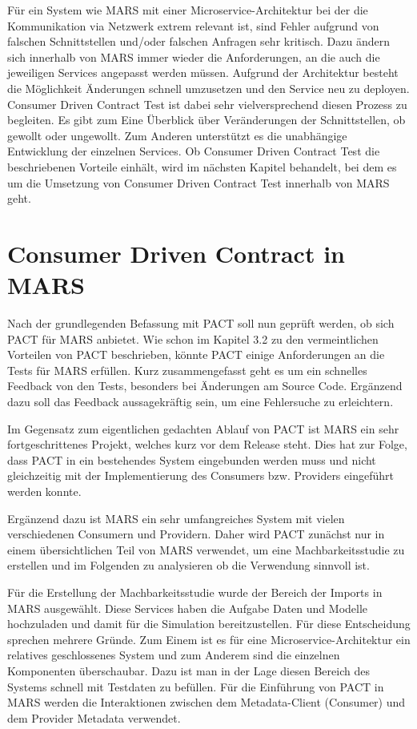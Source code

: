 \documentclass{llncs}
\begin{document}
Für ein System wie MARS mit einer Microservice-Architektur bei der die Kommunikation via Netzwerk extrem relevant ist, sind Fehler aufgrund von falschen Schnittstellen und/oder falschen Anfragen sehr kritisch. Dazu ändern sich innerhalb von MARS immer wieder die Anforderungen, an die auch die jeweiligen Services angepasst werden müssen. Aufgrund der Architektur besteht die Möglichkeit Änderungen schnell umzusetzen und den Service neu zu deployen. Consumer Driven Contract Test ist dabei sehr vielversprechend diesen Prozess zu begleiten. Es gibt zum Eine Überblick über Veränderungen der Schnittstellen, ob gewollt oder ungewollt. Zum Anderen unterstützt es die unabhängige Entwicklung der einzelnen Services. Ob Consumer Driven Contract Test die beschriebenen Vorteile einhält, wird im nächsten Kapitel behandelt, bei dem es um die Umsetzung von Consumer Driven Contract Test innerhalb von MARS geht.

\section{Consumer Driven Contract in MARS}
Nach der grundlegenden Befassung mit PACT soll nun geprüft werden, ob sich PACT für MARS anbietet. Wie schon im Kapitel 3.2 zu den vermeintlichen Vorteilen von PACT beschrieben, könnte PACT einige Anforderungen an die Tests für MARS erfüllen.
Kurz zusammengefasst geht es um ein schnelles Feedback von den Tests, besonders bei Änderungen am Source Code. Ergänzend dazu soll das Feedback aussagekräftig sein, um eine Fehlersuche zu erleichtern.

Im Gegensatz zum eigentlichen gedachten Ablauf von PACT ist MARS ein sehr fortgeschrittenes Projekt, welches kurz vor dem Release steht. Dies hat zur Folge, dass PACT in ein bestehendes System eingebunden werden muss und nicht gleichzeitig mit der Implementierung des Consumers bzw. Providers eingeführt werden konnte.

Ergänzend dazu ist MARS ein sehr umfangreiches System mit vielen verschiedenen Consumern und Providern. Daher wird PACT zunächst nur in einem übersichtlichen Teil von MARS verwendet, um eine Machbarkeitsstudie zu erstellen und im Folgenden zu analysieren ob die Verwendung sinnvoll ist.

Für die Erstellung der Machbarkeitsstudie wurde der Bereich der Imports in MARS ausgewählt. Diese Services haben die Aufgabe Daten und Modelle hochzuladen und damit für die Simulation bereitzustellen. Für diese Entscheidung sprechen mehrere Gründe. Zum Einem ist es für eine Microservice-Architektur ein relatives geschlossenes System und zum Anderem sind die einzelnen Komponenten überschaubar. Dazu ist man in der Lage diesen Bereich des Systems schnell mit Testdaten zu befüllen. Für die Einführung von PACT in MARS werden die Interaktionen zwischen dem Metadata-Client (Consumer) und dem Provider Metadata verwendet.
\end{document}
